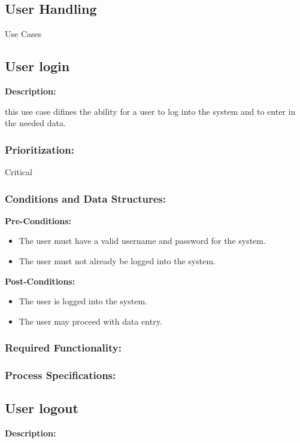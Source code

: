 
\newpage
\setlength{\voffset}{-3cm}

\begin{center}
\section{\textbf{\huge{User Handling}}}

\Large{Use Cases}
\end{center}


\subsection{User login}
\textbf{Description:}

this use case difines the ability for a user to log into the system and to enter in the needed data.
\subsubsection{Prioritization:}
Critical
\subsubsection{Conditions and Data Structures:}
\textbf{Pre-Conditions:}
\begin{itemize}
	\item The user must have a valid username and password for the system.
	\item The user must not already be logged into the system.
\end{itemize}
\textbf{Post-Conditions:}
	\begin{itemize}
		\item The user is logged into  the system.
		\item The user may proceed with data entry.
	\end{itemize}
\subsubsection{Required Functionality:} 

\subsubsection{Process Specifications:} 

\subsection{User logout}
\textbf{Description:}
